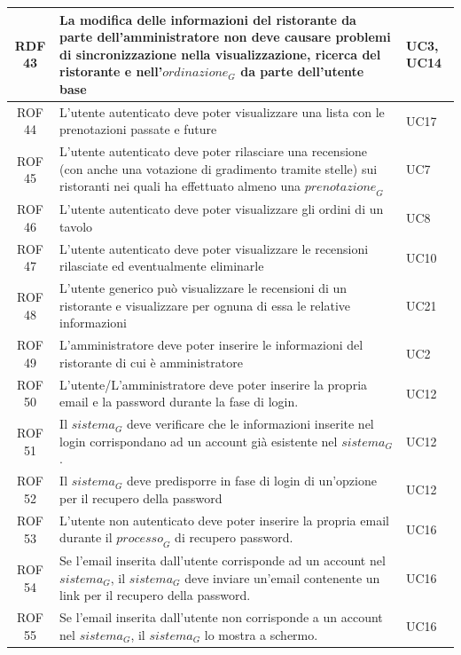 \documentclass[12pt, oneside]{article}
\begin{document}
\begin{longtable}{|c|p{14cm}|p{2cm}|}
    \hline
    RDF 43& La modifica delle informazioni del ristorante da parte dell'amministratore non deve causare problemi di sincronizzazione nella visualizzazione, ricerca del ristorante e nell'$\textit{ordinazione}_G$ da parte dell'utente base & UC3, UC14 \\
    \hline
    ROF 44& L'utente autenticato deve poter visualizzare una lista con le prenotazioni passate e future & UC17 \\
    \hline
    ROF 45& L'utente autenticato deve poter rilasciare una recensione (con anche una votazione di gradimento tramite stelle) sui ristoranti nei quali ha effettuato almeno una $\textit{prenotazione}_G$ & UC7 \\
    \hline
    ROF 46& L'utente autenticato deve poter visualizzare gli ordini di un tavolo & UC8 \\
    \hline
    ROF 47& L'utente autenticato deve poter visualizzare le recensioni rilasciate ed eventualmente eliminarle & UC10 \\
    \hline
    ROF 48& L'utente generico può visualizzare le recensioni di un ristorante e visualizzare per ognuna di essa le relative informazioni & UC21 \\
    \hline
    ROF 49& L'amministratore deve poter inserire le informazioni del ristorante di cui è amministratore & UC2 \\
    \hline
    ROF 50& L'utente/L'amministratore deve poter inserire la propria email e la password durante la fase di login.  & UC12 \\
    \hline
    ROF 51& Il $\textit{sistema}_G$ deve verificare che le informazioni inserite nel login corrispondano ad un account già esistente nel $\textit{sistema}_G$.  & UC12 \\
    \hline
    ROF 52& Il $\textit{sistema}_G$ deve predisporre in fase di login di un'opzione per il recupero della password  & UC12 \\
    \hline
    ROF 53& L'utente non autenticato deve poter inserire la propria email durante il $\textit{processo}_G$ di recupero password.  & UC16 \\
    \hline
    ROF 54 & Se l'email inserita dall'utente corrisponde ad un account nel $\textit{sistema}_G$, il $\textit{sistema}_G$ deve inviare un'email contenente un link per il recupero della password.  & UC16 \\
    \hline
    ROF 55 & Se l'email inserita dall'utente non corrisponde a un account nel $\textit{sistema}_G$, il $\textit{sistema}_G$ lo mostra a schermo.  & UC16 \\

\end{longtable}
\end{document}
